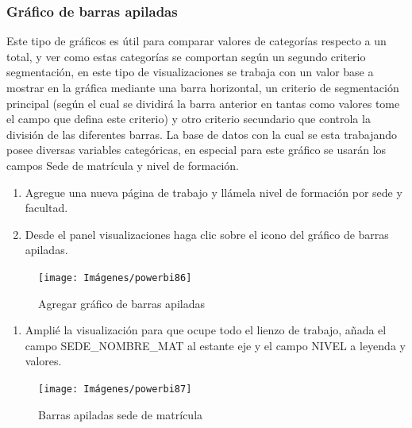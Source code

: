\documentclass[
]{book}
\providecommand{\tightlist}{%
  \setlength{\itemsep}{0pt}\setlength{\parskip}{0pt}}
\begin{document}
\hypertarget{barrasapiladas}{%
\subsubsection{Gráfico de barras apiladas}\label{barrasapiladas}}

Este tipo de gráficos es útil para comparar valores de categorías respecto a un total, y ver como estas categorías se comportan según un segundo criterio segmentación, en este tipo de visualizaciones se trabaja con un valor base a mostrar en la gráfica mediante una barra horizontal, un criterio de segmentación principal (según el cual se dividirá la barra anterior en tantas como valores tome el campo que defina este criterio) y otro criterio secundario que controla la división de las diferentes barras.
La base de datos con la cual se esta trabajando posee diversas variables categóricas, en especial para este gráfico se usarán los campos Sede de matrícula y nivel de formación.

\begin{enumerate}
\def\labelenumi{\arabic{enumi}.}
\item
  Agregue una nueva página de trabajo y llámela nivel de formación por sede y facultad.
\item
  Desde el panel visualizaciones haga clic sobre el icono del gráfico de barras apiladas.
\end{enumerate}

\begin{figure}

{\centering \texttt{[image: Imágenes/powerbi86]} 

}

\caption{Agregar gráfico de barras apiladas}\label{fig:paso2barrasapiladas-fig}
\end{figure}

\begin{enumerate}
\def\labelenumi{\arabic{enumi}.}
\setcounter{enumi}{2}
\tightlist
\item
  Amplié la visualización para que ocupe todo el lienzo de trabajo, añada el campo SEDE\_NOMBRE\_MAT al estante eje y el campo NIVEL a leyenda y valores.
\end{enumerate}

\begin{figure}

{\centering \texttt{[image: Imágenes/powerbi87]} 

}

\caption{Barras apiladas sede de matrícula}\label{fig:paso3barrasapiladas-fig}
\end{figure}
\end{document}
